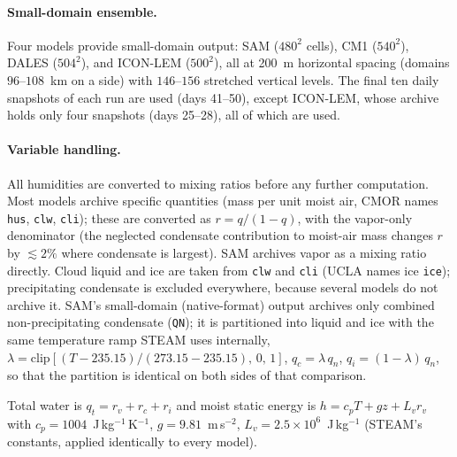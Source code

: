 \paragraph{Small-domain ensemble.} Four models provide small-domain
output: SAM ($480^2$ cells), CM1 ($540^2$), DALES ($504^2$), and
ICON-LEM ($500^2$), all at 200~m horizontal spacing (domains
$96$--$108$~km on a side) with $146$--$156$ stretched vertical levels.
The final ten daily snapshots of each run are used (days 41--50), except
ICON-LEM, whose archive holds only four snapshots (days 25--28), all of
which are used.

\paragraph{Variable handling.} All humidities are converted to mixing
ratios before any further computation. Most models archive specific
quantities (mass per unit moist air, CMOR names \texttt{hus},
\texttt{clw}, \texttt{cli}); these are converted as $r = q/(1-q)$, with
the vapor-only denominator (the neglected condensate contribution to
moist-air mass changes $r$ by ${\lesssim}2\%$ where condensate is
largest). SAM archives vapor as a mixing ratio directly. Cloud liquid
and ice are taken from \texttt{clw} and \texttt{cli} (UCLA names ice
\texttt{ice}); precipitating condensate is excluded everywhere, because
several models do not archive it. SAM's small-domain (native-format)
output archives only combined non-precipitating condensate
(\texttt{QN}); it is partitioned into liquid and ice with the same
temperature ramp STEAM uses internally,
$\lambda = \mathrm{clip}\!\left[(T - 235.15)/(273.15 - 235.15),\,0,\,1\right]$,
$q_c = \lambda\,q_n$, $q_i = (1-\lambda)\,q_n$, so that the partition is
identical on both sides of that comparison.

Total water is $q_t = r_v + r_c + r_i$ and moist static energy is
$h = c_p T + g z + L_v r_v$ with $c_p = 1004$~J\,kg$^{-1}$\,K$^{-1}$,
$g = 9.81$~m\,s$^{-2}$, $L_v = 2.5\times 10^6$~J\,kg$^{-1}$ (STEAM's
constants, applied identically to every model).

